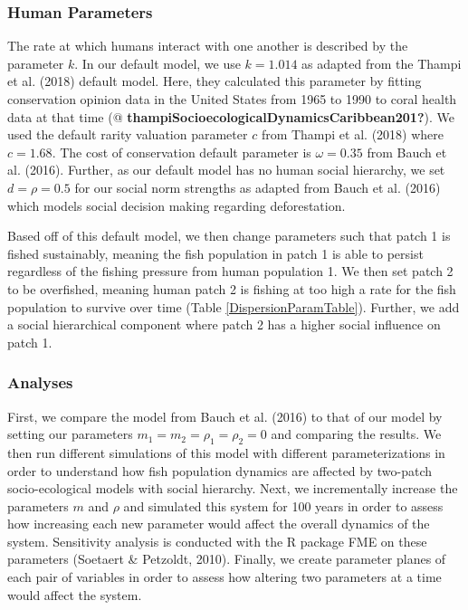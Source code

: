 \documentclass[
  12pt,
]{article}
\begin{document}
\hypertarget{human-parameters}{%
\subsubsection{Human Parameters}\label{human-parameters}}

The rate at which humans interact with one another is described by the parameter \(k\). In our default model, we use \(k = 1.014\) as adapted from the Thampi et al. (2018) default model. Here, they calculated this parameter by fitting conservation opinion data in the United States from 1965 to 1990 to coral health data at that time (@ \textbf{thampiSocioecologicalDynamicsCaribbean201?}). We used the default rarity valuation parameter \(c\) from Thampi et al. (2018) where \(c = 1.68\). The cost of conservation default parameter is \(\omega = 0.35\) from Bauch et al. (2016). Further, as our default model has no human social hierarchy, we set \(d = \rho = 0.5\) for our social norm strengths as adapted from Bauch et al. (2016) which models social decision making regarding deforestation.

Based off of this default model, we then change parameters such that patch 1 is fished sustainably, meaning the fish population in patch 1 is able to persist regardless of the fishing pressure from human population 1. We then set patch 2 to be overfished, meaning human patch 2 is fishing at too high a rate for the fish population to survive over time (Table \ref{DispersionParamTable}). Further, we add a social hierarchical component where patch 2 has a higher social influence on patch 1.

\hypertarget{analyses}{%
\subsubsection{Analyses}\label{analyses}}

First, we compare the model from Bauch et al. (2016) to that of our model by setting our parameters \(m_1 = m_2 = \rho_1 = \rho_2 = 0\) and comparing the results. We then run different simulations of this model with different parameterizations in order to understand how fish population dynamics are affected by two-patch socio-ecological models with social hierarchy. Next, we incrementally increase the parameters \(m\) and \(\rho\) and simulated this system for 100 years in order to assess how increasing each new parameter would affect the overall dynamics of the system. Sensitivity analysis is conducted with the R package FME on these parameters (Soetaert \& Petzoldt, 2010). Finally, we create parameter planes of each pair of variables in order to assess how altering two parameters at a time would affect the system.
\end{document}
